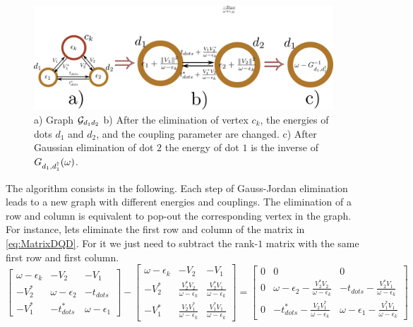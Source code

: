 \begin{figure}[t]
    \centering
    \includegraphics[scale=0.4]{IMAGES/Graphs/DQD-Pro.png}
    \caption{ a) Graph $\mathcal{G}_{d_1d_2}$ b) After the elimination of vertex $c_k$, the energies of dots $d_1$ and $d_2$, and the coupling parameter are changed. c) After Gaussian elimination of dot $2$ the energy of dot $1$ is the inverse of $G_{d_1,d^\dagger_1}(\omega)$. \protect{}}
    \label{fig:graphDQD}
\end{figure}


The algorithm consists in the following. Each step of Gauss-Jordan elimination leads to a new graph with different energies and couplings. The elimination of a row and column is equivalent to pop-out the corresponding vertex in the graph. For instance, lets eliminate the first row and column of the matrix in \eqref{eq:MatrixDQD}. For it we just need to subtract the rank-$1$ matrix with the same first row and first column. 
\begin{equation}
        \left[\begin{array}{ccc}
    \omega-\epsilon_{k} & -V_{2} & -V_{1}\\
    -V_{2}^{*} & \omega-\epsilon_{2} & -t_{dots}\\
    -V_{1}^{*} & -t_{dots}^{*} & \omega-\epsilon_{1}
    \end{array}\right]-\left[\begin{array}{ccc}
    \omega-\epsilon_{k} & -V_{2} & -V_{1}\\
    -V_{2}^{*} & \frac{V_{2}^{*}V_{2}}{\omega-\epsilon_{k}} & \frac{V_{2}^{*}V_{1}}{\omega-\epsilon_{k}}\\
    -V_{1}^{*} & \frac{V_{2}V_{1}^{*}}{\omega-\epsilon_{k}} & \frac{V_{1}^{*}V_{1}}{\omega-\epsilon_{k}}
    \end{array}\right]=\left[\begin{array}{ccc}
    0 & 0 & 0\\
    0 & \omega-\epsilon_{2}-\frac{V_{2}^{*}V_{2}}{\omega-\epsilon_{k}} & -t_{dots}-\frac{V_{2}^{*}V_{1}}{\omega-\epsilon_{k}}\\
    0 & -t_{dots}^{*}-\frac{V_{2}V_{1}^{*}}{\omega-\epsilon_{k}} & \omega-\epsilon_{1}-\frac{V_{1}^{*}V_{1}}{\omega-\epsilon_{k}}
    \end{array}\right]
    \label{eq:Gauss-Jordan} 
\end{equation}

